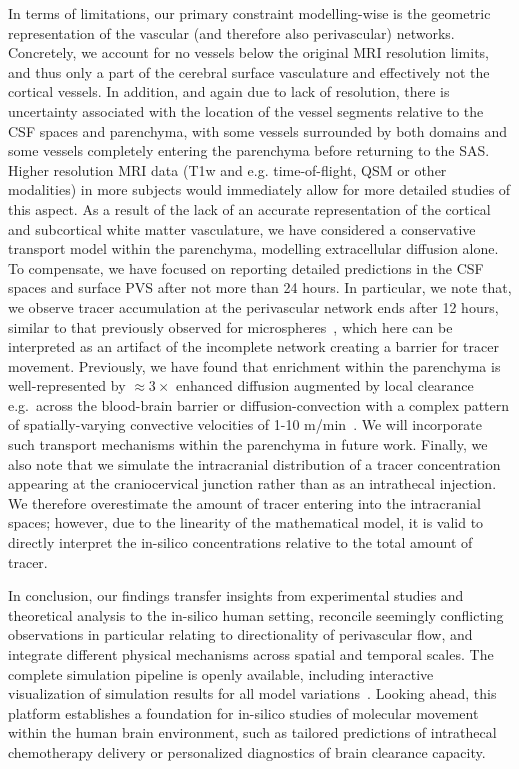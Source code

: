 \documentclass[fleqn,10pt]{wlscirep}
\begin{document}
In terms of limitations, our primary constraint modelling-wise is the
geometric representation of the vascular (and therefore also
perivascular) networks. Concretely, we account for no vessels below
the original MRI resolution limits, and thus only a part of the
cerebral surface vasculature and effectively not the cortical
vessels. In addition, and again due to lack of resolution, there is
uncertainty associated with the location of the vessel segments
relative to the CSF spaces and parenchyma, with some vessels
surrounded by both domains and some vessels completely entering the
parenchyma before returning to the SAS. Higher resolution MRI data
(T1w and e.g. time-of-flight, QSM or other modalities) in more
subjects would immediately allow for more detailed studies of this
aspect. As a result of the lack of an accurate representation of the
cortical and subcortical white matter vasculature, we have considered
a conservative transport model within the parenchyma, modelling
extracellular diffusion alone. To compensate, we have focused on
reporting detailed predictions in the CSF spaces and surface PVS after
not more than 24 hours. In particular, we note that, we observe tracer
accumulation at the perivascular network ends after 12 hours,
similar to that previously observed for
microspheres~\cite{bedussi2018paravascular, mestre2018flow}, which
here can be interpreted as an artifact of the incomplete network
creating a barrier for tracer movement. Previously, we have found
that enrichment within the parenchyma is well-represented by $\approx
3\times$ enhanced diffusion augmented by local clearance e.g.~across
the blood-brain barrier or diffusion-convection with a complex pattern
of spatially-varying convective velocities of 1-10 \textmu
m/min~\cite{vinje2023human}. We will incorporate such transport
mechanisms within the parenchyma in future work. Finally, we also note
that we simulate the intracranial distribution of a tracer
concentration appearing at the craniocervical junction rather than as
an intrathecal injection. We therefore overestimate the amount of
tracer entering into the intracranial spaces; however, due to the
linearity of the mathematical model, it is valid to directly interpret
the in-silico concentrations relative to the total amount of tracer.



In conclusion, our findings transfer insights from experimental
studies and theoretical analysis to the in-silico human setting,
reconcile seemingly conflicting observations in particular relating to
directionality of perivascular flow, and integrate different physical
mechanisms across spatial and temporal scales. The complete
simulation pipeline is openly available, including interactive
visualization of simulation results for all model
variations~\cite{ZENODO}. Looking ahead, this platform establishes a
foundation for in-silico studies of molecular movement within the
human brain environment, such as tailored predictions of intrathecal
chemotherapy delivery or personalized diagnostics of brain clearance
capacity.
\end{document}
